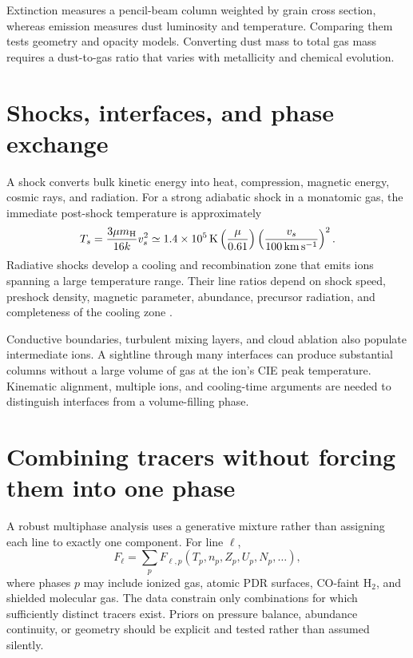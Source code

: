 Extinction measures a pencil-beam column weighted by grain cross section, whereas
emission measures dust luminosity and temperature.  Comparing them tests geometry and
opacity models.  Converting dust mass to total gas mass requires a dust-to-gas ratio
that varies with metallicity and chemical evolution.

\section{Shocks, interfaces, and phase exchange}

A shock converts bulk kinetic energy into heat, compression, magnetic energy, cosmic
rays, and radiation.  For a strong adiabatic shock in a monatomic gas, the immediate
post-shock temperature is approximately
\begin{equation}
 T_s=\frac{3\mu m_{\rm H}}{16k}v_s^2
 \simeq1.4\times10^5\,\mathrm{K}
 \left(\frac{\mu}{0.61}\right)
 \left(\frac{v_s}{100\,\mathrm{km\,s^{-1}}}\right)^2.
 \label{eq:shock-temperature}
\end{equation}
Radiative shocks develop a cooling and recombination zone that emits ions spanning a
large temperature range.  Their line ratios depend on shock speed, preshock density,
magnetic parameter, abundance, precursor radiation, and completeness of the cooling
zone \citep{DopitaSutherland2003}.

Conductive boundaries, turbulent mixing layers, and cloud ablation also populate
intermediate ions.  A sightline through many interfaces can produce substantial
columns without a large volume of gas at the ion's CIE peak temperature.  Kinematic
alignment, multiple ions, and cooling-time arguments are needed to distinguish
interfaces from a volume-filling phase.

\section{Combining tracers without forcing them into one phase}

A robust multiphase analysis uses a generative mixture rather than assigning each
line to exactly one component.  For line $\ell$,
\begin{equation}
 F_\ell=\sum_p F_{\ell,p}(T_p,n_p,Z_p,U_p,N_p,\ldots),
 \label{eq:multiphase-flux-sum}
\end{equation}
where phases $p$ may include ionized gas, atomic PDR surfaces, CO-faint H$_2$, and
shielded molecular gas.  The data constrain only combinations for which sufficiently
distinct tracers exist.  Priors on pressure balance, abundance continuity, or geometry
should be explicit and tested rather than assumed silently.

